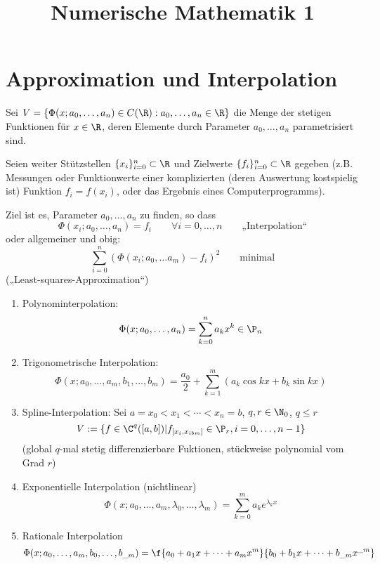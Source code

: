 \documentclass[a4paper,11pt]{scrartcl}
\title{Numerische Mathematik 1}
\begin{document}
\maketitle

\tableofcontents
\newpage

\section{Approximation und Interpolation}

Sei $V= \{\Phi(x;a_0,\dotsc, a_n) \in C(\R) : a_0,\dotsc,a_n\in \R\}$ die Menge der stetigen Funktionen für $x\in \R$, deren Elemente durch Parameter $a_0,\dotsc,a_n$ parametrisiert sind.

Seien weiter Stützstellen $\{x_i\}_{i=0}^n\subset \R$ und Zielwerte $\{f_i\}_{i=0}^n \subset \R$ gegeben (z.B. Messungen oder Funktionwerte einer komplizierten (deren Auswertung kostspielig ist) Funktion $f_i=f(x_i)$, oder das Ergebnis eines Computerprogramms).

Ziel ist es, Parameter $a_0,\dotsc, a_n$ zu finden, so dass
\[
	\Phi(x_i;a_0,\dotsc, a_n) = f_i \qquad \forall i= 0,\dotsc,n \qquad \text{„Interpolation“}
\]
oder allgemeiner und obig:
\[
	\sum_{i=0}^n(\Phi(x_i; a_0,\dotsc a_m) -f_i)^2 \qquad \text{minimal}
\]
(„Least-squares-Approximation“)

\begin{ex*}
	\begin{enumerate}
		\item 
			Polynominterpolation:
			\[
				\Phi(x; a_0,\dotsc, a_n) = \sum_{k=0}^na_kx^k \in \P_n
			\]
		\item
			Trigonometrische Interpolation:
			\[
				\Phi ( x;a_0,\dots,a_m,b_1,\dots, b_m ) = \frac{a_{0}}{2} + \sum_{k=1}^m ( a_k \cos kx + b_k \sin kx )
			\]
		\item
			Spline-Interpolation:
			Sei $a=x_0\lt x_1 \lt \dotsb \lt x_n = b$, $q,r\in \N_0$, $q\le r$
			\[
			V := \{f\in \C^q([a,b]) | f_{[x_i,x_{ibm}]}\in \P_r, i=0,\dotsc,n-1\}
			\]
			(global $q$-mal stetig differenzierbare Fuktionen, stückweise polynomial vom Grad $r$)
		\item
			Exponentielle Interpolation (nichtlinear)
			\[
			\Phi(x;a_0,\dotsc, a_m,\lambda_0,\dotsc, \lambda_m) = \sum_{k=0}^m a_ke^{\lambda_k x}
			\]
		\item
			Rationale Interpolation
			\[
				\Phi(x; a_0,\dotsc, a_m, b_0,\dotsc, b_{\_m}) = \f {a_0 + a_1x + \dotsb + a_m x^m}{b_0 + b_1x + \dotsb + b_{\_m}x^{\_m}}
			\]
	\end{enumerate}
\end{ex*}
\end{document}
